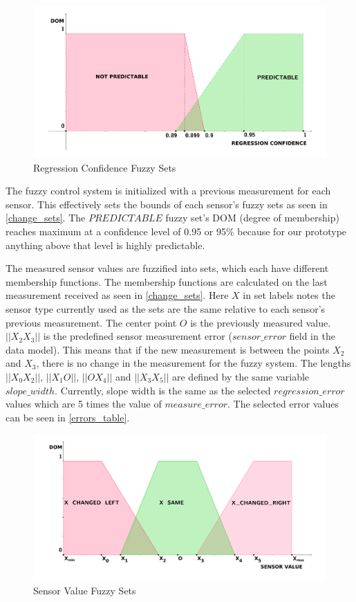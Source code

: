 \begin{figure}[h!]
\centering
\includegraphics[scale=0.58]{4/figures/pred_sets.pdf}
\caption{Regression Confidence Fuzzy Sets}
\label{pred_sets}
\end{figure}

The fuzzy control system is initialized with a previous measurement for each sensor. This effectively sets the bounds of each sensor's fuzzy sets as seen in \autoref{change_sets}. The $PREDICTABLE$ fuzzy set's DOM (degree of membership) reaches maximum at a confidence level of 0.95 or 95\% because for our prototype anything above that level is highly predictable. 

The measured sensor values are fuzzified into sets, which each have different membership functions. The membership functions are calculated on the last measurement received as seen in \autoref{change_sets}. Here $X$ in set labels notes the sensor type currently used as the sets are the same relative to each sensor's previous measurement. The center point $O$ is the previously measured value. $||X_2X_3||$ is the predefined sensor measurement error  ($sensor\_error$ field in the data model). This means that if the new measurement is between the points $X_2$ and $X_3$, there is no change in the measurement for the fuzzy system. The lengths $||X_0X_2||$, $||X_1O||$, $||OX_4||$ and $||X_3X_5||$ are defined by the same variable $slope\_width$. Currently, slope width is the same as the selected $regression\_error$ values which are 5 times the value of $measure\_error$. The selected error values can be seen in \autoref{errors_table}. 

\begin{figure}[h!]
\centering
\includegraphics[scale=0.55]{4/figures/change_sets.pdf}
\caption{Sensor Value Fuzzy Sets}
\label{change_sets}
\end{figure}


